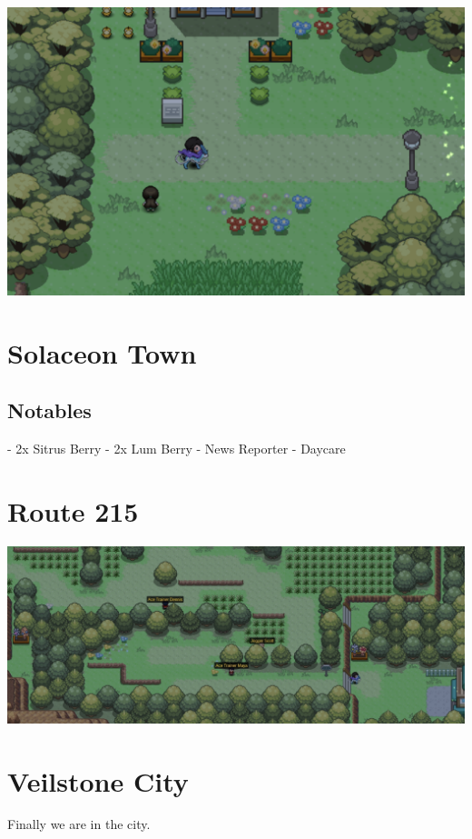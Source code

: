 \documentclass[11pt]{article}
\begin{document}
\includegraphics[width=\textwidth]{walkthrough/Sinnoh/Route_210}



\section{Solaceon Town}\label{sec:solaceon-town}

\subsection{Notables}\label{subsec:notables-solaceon-town}
- 2x Sitrus Berry
- 2x Lum Berry
- News Reporter
- Daycare


\section{Route 215}\label{sec:Route_215}

\includegraphics[width=\textwidth]{walkthrough/Sinnoh/Route_215}



\section{Veilstone City}\label{sec:veilstone-city}
Finally we are in the city.
\end{document}
